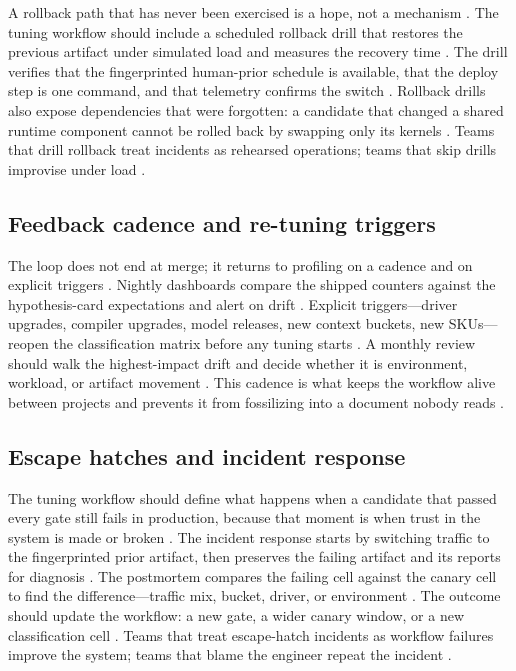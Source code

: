 A rollback path that has never been exercised is a hope, not a mechanism \citep{memoryfloor2026,chen2020compilerbasedhardw,patel2025llminference}. The tuning workflow should include a scheduled rollback drill that restores the previous artifact under simulated load and measures the recovery time \citep{taxbreak2026,memoryfloor2026}. The drill verifies that the fingerprinted human-prior schedule is available, that the deploy step is one command, and that telemetry confirms the switch \citep{chen2020compilerbasedhardw,patel2025llminference}. Rollback drills also expose dependencies that were forgotten: a candidate that changed a shared runtime component cannot be rolled back by swapping only its kernels \citep{memoryfloor2026,taxbreak2026}. Teams that drill rollback treat incidents as rehearsed operations; teams that skip drills improvise under load \citep{patel2025llminference,memoryfloor2026}.

\subsection{Feedback cadence and re-tuning triggers}

The loop does not end at merge; it returns to profiling on a cadence and on explicit triggers \citep{chen2020compilerbasedhardw,memoryfloor2026,taxbreak2026}. Nightly dashboards compare the shipped counters against the hypothesis-card expectations and alert on drift \citep{patel2025llminference,memoryfloor2026}. Explicit triggers—driver upgrades, compiler upgrades, model releases, new context buckets, new SKUs—reopen the classification matrix before any tuning starts \citep{taxbreak2026,chen2020compilerbasedhardw}. A monthly review should walk the highest-impact drift and decide whether it is environment, workload, or artifact movement \citep{patel2025llminference,memoryfloor2026}. This cadence is what keeps the workflow alive between projects and prevents it from fossilizing into a document nobody reads \citep{chen2020compilerbasedhardw,taxbreak2026}.

\subsection{Escape hatches and incident response}

The tuning workflow should define what happens when a candidate that passed every gate still fails in production, because that moment is when trust in the system is made or broken \citep{patel2025llminference,memoryfloor2026,taxbreak2026}. The incident response starts by switching traffic to the fingerprinted prior artifact, then preserves the failing artifact and its reports for diagnosis \citep{chen2020compilerbasedhardw,memoryfloor2026}. The postmortem compares the failing cell against the canary cell to find the difference—traffic mix, bucket, driver, or environment \citep{patel2025llminference,kwon2023vllm}. The outcome should update the workflow: a new gate, a wider canary window, or a new classification cell \citep{chen2020compilerbasedhardw,taxbreak2026}. Teams that treat escape-hatch incidents as workflow failures improve the system; teams that blame the engineer repeat the incident \citep{memoryfloor2026,patel2025llminference}.

